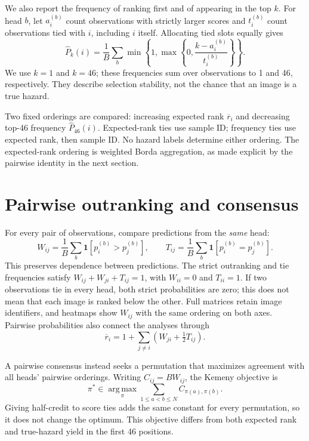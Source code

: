 \documentclass[10pt,a4paper]{article}
\newcommand{\ind}{\mathbf{1}}
\begin{document}
We also report the frequency of ranking first and of appearing in the top $k$.
For head $b$, let $a_i^{(b)}$ count observations with strictly larger scores and
$t_i^{(b)}$ count observations tied with $i$, including $i$ itself. Allocating tied
slots equally gives
\begin{equation}
\widehat P_k(i)=\frac{1}{B}\sum_b
\min\!\left\{1,\max\!\left\{0,\frac{k-a_i^{(b)}}{t_i^{(b)}}\right\}\right\}.
\end{equation}
We use $k=1$ and $k=46$; these frequencies sum over observations to 1 and 46,
respectively. They describe selection stability, not the chance that an image
is a true hazard.

Two fixed orderings are compared: increasing expected rank $\overline r_i$ and
decreasing top-46 frequency $\widehat P_{46}(i)$. Expected-rank ties use sample ID;
frequency ties use expected rank, then sample ID. No hazard labels determine
either ordering. The expected-rank ordering is weighted Borda aggregation, as
made explicit by the pairwise identity in the next section.

\section{Pairwise outranking and consensus}
\label{sec:pairwise}
For every pair of observations, compare predictions from the \emph{same} head:
\begin{equation}
W_{ij}=\frac{1}{B}\sum_b\ind[p_i^{(b)}>p_j^{(b)}],\qquad
T_{ij}=\frac{1}{B}\sum_b\ind[p_i^{(b)}=p_j^{(b)}].
\end{equation}
This preserves dependence between predictions. The strict outranking and tie
frequencies satisfy $W_{ij}+W_{ji}+T_{ij}=1$, with $W_{ii}=0$ and $T_{ii}=1$.
If two observations tie in every head, both strict probabilities are zero;
this does not mean that each image is ranked below the other. Full matrices
retain image identifiers, and heatmaps show $W_{ij}$ with the same ordering on
both axes. Pairwise probabilities also connect the analyses through
\begin{equation}
\overline r_i=1+\sum_{j\ne i}\left(W_{ji}+\tfrac12T_{ij}\right).
\end{equation}

A pairwise consensus instead seeks a permutation that maximizes agreement with
all heads' pairwise orderings. Writing $C_{ij}=BW_{ij}$, the Kemeny objective is
\begin{equation}
\pi^*\in\operatorname*{arg\,max}_{\pi}
\sum_{1\leq a<b\leq N}C_{\pi(a),\pi(b)}.
\label{eq:objective}
\end{equation}
Giving half-credit to score ties adds the same constant for every permutation,
so it does not change the optimum. This objective differs from both expected
rank and true-hazard yield in the first 46 positions.
\end{document}
